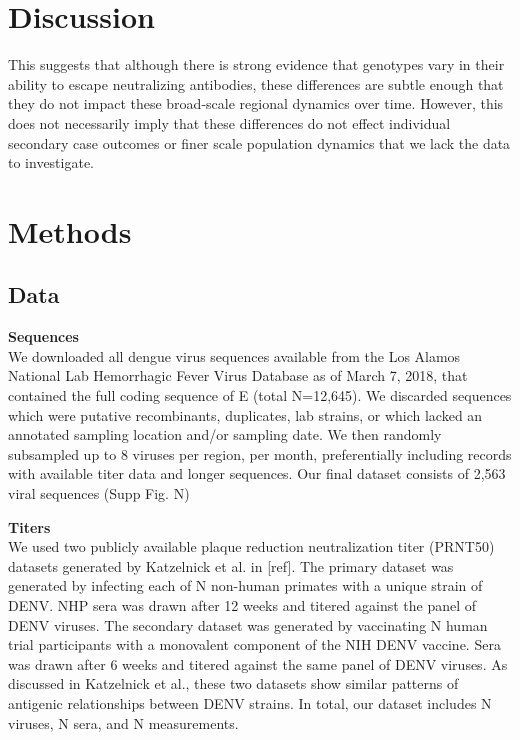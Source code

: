 \documentclass[11pt,oneside,letterpaper]{article}
\begin{document}
\section*{Discussion}

This suggests that although there is strong evidence that genotypes vary in their ability to escape neutralizing antibodies, these differences are subtle enough that they do not impact these broad-scale regional dynamics over time.
However, this does not necessarily imply that these differences do not effect individual secondary case outcomes or finer scale population dynamics that we lack the data to investigate.

\newpage

\section*{Methods}
\subsection*{Data}
\textbf{Sequences}\\
We downloaded all dengue virus sequences available from the Los Alamos National Lab Hemorrhagic Fever Virus Database as of March 7, 2018, that contained the full coding sequence of E (total N=12,645).
We discarded sequences which were putative recombinants, duplicates, lab strains, or which lacked an annotated sampling location and/or sampling date.
We then randomly subsampled up to 8 viruses per region, per month, preferentially including records with available titer data and longer sequences.
Our final dataset consists of 2,563 viral sequences (Supp Fig. N)

\textbf{Titers}\\
We used two publicly available plaque reduction neutralization titer (PRNT50) datasets generated by Katzelnick et al. in {[}ref{]}.
The primary dataset was generated by infecting each of N non-human primates with a unique strain of DENV.
NHP sera was drawn after 12 weeks and titered against the panel of DENV viruses.
The secondary dataset was generated by vaccinating N human trial participants with a monovalent component of the NIH DENV vaccine.
Sera was drawn after 6 weeks and titered against the same panel of DENV viruses.
As discussed in Katzelnick et al., these two datasets show similar patterns of antigenic relationships between DENV strains.
In total, our dataset includes N viruses, N sera, and N measurements.
\end{document}
